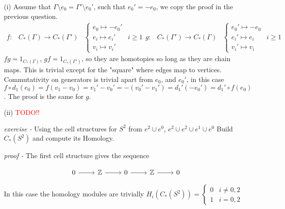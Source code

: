 \documentclass[11pt]{article}
\theoremstyle{definition}
\begin{document}
    (i) Assume that \(\Gamma\setminus e_0 = \Gamma' \setminus e_0'\), such that \(e_0' = -e_0\), we copy the proof in the previous question.
    \begin{align*}
        f: &C_*(\Gamma) \to C_*(\Gamma')
        &\begin{cases}
            e_0 \mapsto -e_0' \\
            e_i \mapsto e_i' & i \geq 1 \\
            v_i \mapsto v_i'
        \end{cases}
        g: &C_*(\Gamma') \to C_*(\Gamma)
        &\begin{cases}
            e_0' \mapsto -e_0 \\
            e_i' \mapsto e_i & i \geq 1 \\
            v_i' \mapsto v_i
        \end{cases}
    \end{align*}
    \(fg = 1_{C_*(\Gamma)}\), \(gf = 1_{C_*(\Gamma')}\), so they are homotopies so long as they are chain maps. This is trivial except for the "square" where edges map to vertices.
    Commutativity on generators is trivial apart from \(e_0\), and \(e_0'\), in this case \(f\circ d_1(e_0) = f(v_1 - v_0) = v_1' - v_0' = -(v_0' - v_1') = d_1'(-e_0') = d_1'\circ f (e_0)\). The proof is the same for \(g\).

    (ii) \textcolor{red}{TODO!!}



    \emph{exercise - }\label{HEx5} Using the cell structures for \(S^2\) from \(e^2 \cup e^0\), \(e^2 \cup e^2 \cup e^1 \cup e^0\) Build \(C_*(S^2)\) and compute its Homology.

    \emph{proof - } The first cell structure gives the sequence

    \begin{equation*}
        \begin{tikzcd}
            0 \arrow[r] & \mathbb{Z} \arrow[r] & 0 \arrow[r] & \mathbb{Z} \arrow[r] & 0
        \end{tikzcd}
    \end{equation*}

    In this case the homology modules are trivially \(H_i(C_*(S^2)) = \begin{cases}
        0 & i \neq 0,2 \\
        1 & i = 0,2
    \end{cases}\)
\end{document}
